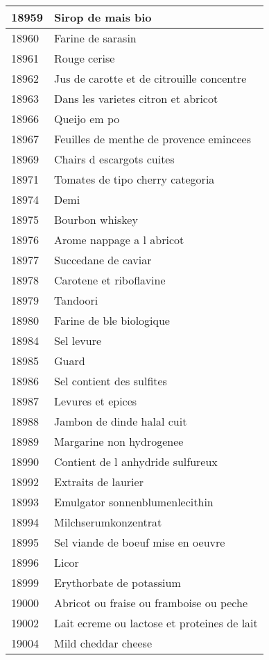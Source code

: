 \begin{longtable}{|l|l|}
18959 & Sirop de mais bio \\ \hline 
18960 & Farine de sarasin \\ \hline 
18961 & Rouge cerise \\ \hline 
18962 & Jus de carotte et de citrouille concentre \\ \hline 
18963 & Dans les varietes citron et abricot \\ \hline 
18966 & Queijo em po \\ \hline 
18967 & Feuilles de menthe de provence emincees \\ \hline 
18969 & Chairs d escargots cuites \\ \hline 
18971 & Tomates de tipo cherry categoria \\ \hline 
18974 & Demi \\ \hline 
18975 & Bourbon whiskey \\ \hline 
18976 & Arome nappage a l abricot \\ \hline 
18977 & Succedane de caviar \\ \hline 
18978 & Carotene et riboflavine \\ \hline 
18979 & Tandoori \\ \hline 
18980 & Farine de ble biologique \\ \hline 
18984 & Sel levure \\ \hline 
18985 & Guard \\ \hline 
18986 & Sel contient des sulfites \\ \hline 
18987 & Levures et epices \\ \hline 
18988 & Jambon de dinde halal cuit \\ \hline 
18989 & Margarine non hydrogenee \\ \hline 
18990 & Contient de l anhydride sulfureux \\ \hline 
18992 & Extraits de laurier \\ \hline 
18993 & Emulgator sonnenblumenlecithin \\ \hline 
18994 & Milchserumkonzentrat \\ \hline 
18995 & Sel viande de boeuf mise en oeuvre \\ \hline 
18996 & Licor \\ \hline 
18999 & Erythorbate de potassium \\ \hline 
19000 & Abricot ou fraise ou framboise ou peche \\ \hline 
19002 & Lait ecreme ou lactose et proteines de lait \\ \hline 
19004 & Mild cheddar cheese \\ \hline 

\end{longtable}
